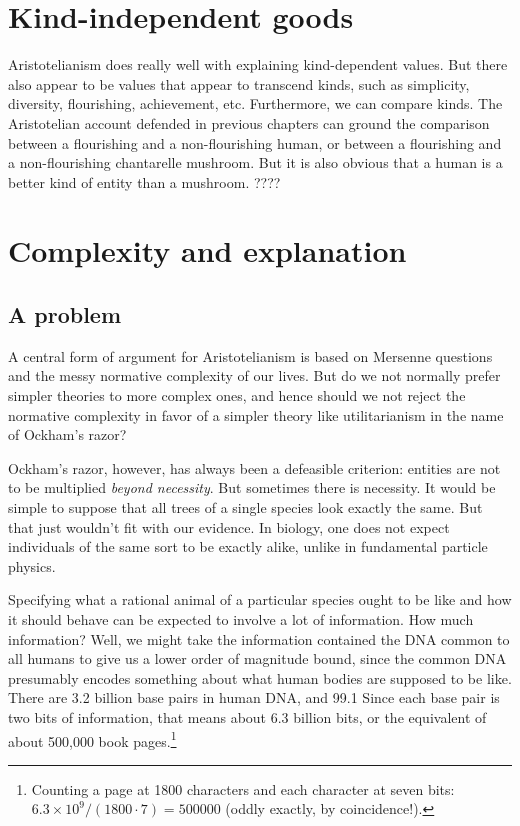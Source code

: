
\section{Kind-independent goods}
Aristotelianism does really well with explaining kind-dependent values. But there also appear to be values that appear
to transcend kinds, such as simplicity, diversity, flourishing, achievement, etc. Furthermore, we can compare kinds.
The Aristotelian account defended in previous chapters can ground the comparison between a flourishing and a non-flourishing 
human, or between a flourishing and a non-flourishing chantarelle mushroom. But it is also obvious that a human is a better
kind of entity than a mushroom.
????

\section{Complexity and explanation}\label{sec:hierarchy}
\subsection{A problem}
A central form of argument for Aristotelianism is based on Mersenne questions and the messy normative complexity of our
lives. But do we not normally prefer simpler theories to more complex ones, and hence should we not reject the normative
complexity in favor of a simpler theory like utilitarianism in the name of Ockham's razor?

Ockham's razor, however, has always been a defeasible criterion: entities are not to be multiplied \textit{beyond necessity}.
But sometimes there is necessity. It would be simple to suppose that all trees of a single species look exactly the same.
But that just wouldn't fit with our evidence. In biology, one does not expect individuals of the same sort to be exactly
alike, unlike in fundamental particle physics. 

Specifying what a rational animal of a particular species ought to be like
and how it should behave can be expected to involve a lot of information. How much information? Well, we might take the information contained
the DNA common to all humans to give us a lower order of magnitude bound, since the common DNA presumably encodes something
about what human bodies are supposed to be like. There are 3.2 billion base pairs in human DNA, and 
99.1%
Since each base pair is two bits of information, that means about 6.3 billion bits, or the equivalent of about 500,000
book pages.\footnote{Counting a page at 1800 characters and each character at seven bits: $6.3\times 10^9/(1800\cdot 7)=500000$
(oddly exactly, by coincidence!).} 

